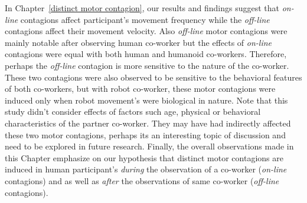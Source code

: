 In Chapter~\ref{distinct motor contagion}, our results and findings suggest that \textit{on-line} contagions affect participant's movement frequency while the \textit{off-line} contagions affect their movement velocity. Also \textit{off-line} motor contagions were mainly notable after observing human co-worker but the effects of \textit{on-line} contagions were equal with both human and humanoid co-workers. Therefore, perhaps the \textit{off-line} contagion is more sensitive to the nature of the co-worker. These two contagions were also observed to be sensitive to the behavioral features of both co-workers, but with robot co-worker, these motor contagions were induced only when robot movement's were biological in nature. Note that this study didn't consider effects of factors such age, physical or behavioral characteristics of the partner co-worker. They may have had indirectly affected these two motor contagions, perhaps its an interesting topic of discussion and need to be explored in future research. Finally, the overall observations made in this Chapter emphasize on our hypothesis that distinct motor contagions are induced in human participant's \emph{during} the observation of a co-worker (\textit{on-line} contagions) and as well as \emph{after} the observations of same co-worker (\textit{off-line} contagions).



